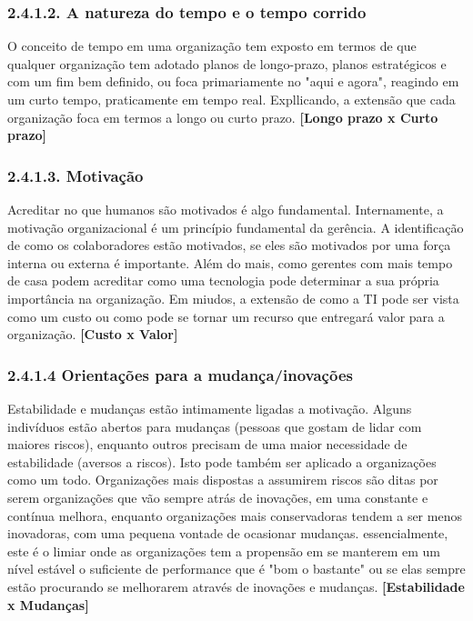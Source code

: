     \subsubsection{2.4.1.2. A natureza do tempo e o tempo corrido}
    O conceito de tempo em uma organização tem exposto em termos de que qualquer organização tem adotado planos de longo-prazo, planos estratégicos e com um fim bem definido, ou foca primariamente no "aqui e agora", reagindo em um curto tempo, praticamente em tempo real. Expllicando, a extensão que cada organização foca em termos a longo ou curto prazo. {\bf [Longo prazo x Curto prazo]}
    
    \subsubsection{2.4.1.3. Motivação}
    Acreditar no que humanos são motivados é algo fundamental. Internamente, a motivação organizacional é um princípio fundamental da gerência. A identificação de como os colaboradores estão motivados, se eles são motivados por uma força interna ou externa é importante. Além do mais, como gerentes com mais tempo de casa podem acreditar como uma tecnologia pode determinar a sua própria importância na organização. Em miudos, a extensão de como a TI pode ser vista como um custo ou como pode se tornar um recurso que entregará valor para a organização. {\bf [Custo x Valor]}
    
    \subsubsection{2.4.1.4 Orientações para a mudança/inovações}
    Estabilidade e mudanças estão intimamente ligadas a motivação. Alguns indivíduos estão abertos para mudanças (pessoas que gostam de lidar com maiores riscos), enquanto outros precisam de uma maior necessidade de estabilidade (aversos a riscos). Isto pode também ser aplicado a organizações como um todo. Organizações mais dispostas a assumirem riscos são ditas por serem organizações que vão sempre atrás de inovações, em uma constante e contínua melhora, enquanto organizações mais conservadoras tendem a ser menos inovadoras, com uma pequena vontade de ocasionar mudanças. essencialmente, este é o limiar onde as organizações tem a propensão em se manterem em um nível estável o suficiente de performance que é "bom o bastante" ou se elas sempre estão procurando se melhorarem através de inovações e mudanças. {\bf [Estabilidade x Mudanças]}
    
